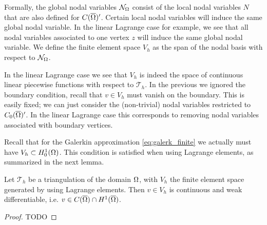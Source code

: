 \documentclass[thesis.tex]{subfiles}
\begin{document}
  Formally, the global nodal variables $\mathcal{N}_\Omega$ consist of the local nodal variables $N$ that are also defined for $C(\overline{\Omega})'$. Certain
  local nodal variables will induce the same global nodal variable. In the linear Lagrange case for example, we see that all nodal variables
  associated to one vertex $z$ will induce the same global nodal variable. We define the finite element space $V_h$ as the span of the 
  nodal basis with respect to $\mathcal{N}_\Omega$. 
  
  In the linear Lagrange case we see that $V_h$ is indeed the space of continuous linear piecewise
  functions with respect to $\mathcal{T}_h$. In the previous we ignored
  the boundary condition, recall that $v \in V_h$ must vanish on the boundary. This is easily fixed; we can just consider the (non-trivial)
  nodal variables restricted to $C_0(\overline{\Omega})'$. In the linear Lagrange case this corresponds to removing nodal variables associated with
  boundary vertices.  
  
  Recall that for the Galerkin approximation \eqref{eq:galerk_finite} we actually must have $V_h \subset H^1_0(\Omega)$. This
  condition is satisfied when using Lagrange elements, as summarized in the next lemma.
  \begin{lem}
    \label{lem:lin_lagrange}
    Let $\mathcal{T}_h$ be a triangulation of the domain $\Omega$, with $V_h$ the finite element space generated
    by using Lagrange elements. Then $v \in V_h$ is continuous and weak differentiable, i.e. $v \in C(\overline{\Omega}) \cap H^1(\overline{\Omega})$. 
  \end{lem}
  \begin{proof}
    TODO
  \end{proof}
\end{document}

